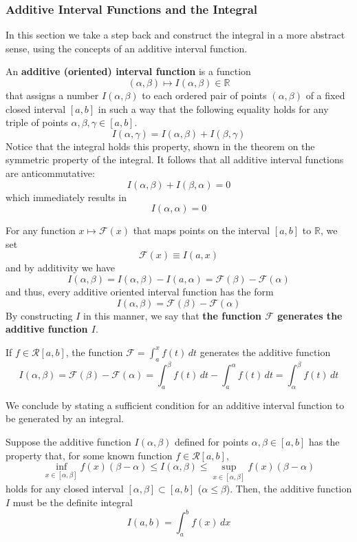     \subsubsection{Additive Interval Functions and the Integral}
    In this section we take a step back and construct the integral in a more abstract sense, using the concepts of an additive interval function. 

    \begin{definition}
      An \textbf{additive (oriented) interval function} is a function 
      \[(\alpha, \beta) \mapsto I(\alpha, \beta) \in \mathbb{R}\]
      that assigns a number $I(\alpha, \beta)$ to each ordered pair of points $(\alpha, \beta)$ of a fixed closed interval $[a, b]$ in such a way that the following equality holds for any triple of points $\alpha, \beta, \gamma \in [a, b]$. 
      \[I(\alpha, \gamma) = I(\alpha, \beta) + I(\beta, \gamma)\]
      Notice that the integral holds this property, shown in the theorem on the symmetric property of the integral. It follows that all additive interval functions are anticommutative: 
      \[I(\alpha, \beta) + I(\beta, \alpha) = 0\]
      which immediately results in
      \[I(\alpha, \alpha) = 0\]
    \end{definition}

    \begin{lemma}
      For any function $x \mapsto \mathcal{F}(x)$ that maps points on the interval $[a, b]$ to $\mathbb{R}$, we set
      \[\mathcal{F}(x) \equiv I(a, x)\]
      and by additivity we have
      \[I(\alpha, \beta) = I(\alpha, \beta) - I(a, \alpha) = \mathcal{F}(\beta) - \mathcal{F}(\alpha)\]
      and thus, every additive oriented interval function has the form 
      \[I(\alpha, \beta) = \mathcal{F}(\beta) - \mathcal{F}(\alpha)\]
      By constructing $I$ in this manner, we say that \textbf{the function $\mathcal{F}$ generates the additive function $I$}. 
    \end{lemma}

    \begin{example}
    If $f \in \mathcal{R}[a, b]$, the function $\mathcal{F} = \int_a^x f(t)\,dt$ generates the additive function
    \[I(\alpha, \beta) = \mathcal{F}(\beta) - \mathcal{F}(\alpha) = \int_a^\beta f(t)\,dt - \int_a^\alpha f(t)\,dt = \int_\alpha^\beta f(t)\,dt\]
    \end{example}

    We conclude by stating a sufficient condition for an additive interval function to be generated by an integral. 
    \begin{theorem}
    Suppose the additive function $I(\alpha, \beta)$ defined for points $\alpha, \beta \in [a, b]$ has the property that, for some known function $f \in \mathcal{R}[a, b]$, 
    \[\inf_{x \in [\alpha, \beta]} f(x) (\beta - \alpha) \leq I(\alpha, \beta) \leq \sup_{x \in [\alpha, \beta]} f(x) (\beta - \alpha)\]
    holds for any closed interval $[\alpha, \beta] \subset [a, b]$ ($\alpha \leq \beta$). Then, the additive function $I$ must be the definite integral
    \[I(a, b) = \int_a^b f(x)\,dx\]
    \end{theorem}


